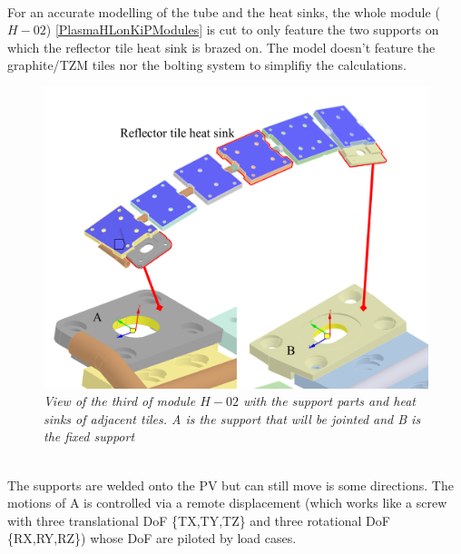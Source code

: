 \\
\normalsize{\indent For an accurate modelling of the tube and the heat sinks, the whole module ($H-02$) \ref{PlasmaHLonKiPModules} is cut to only feature the two supports on which the reflector tile heat sink is brazed on. The model doesn't feature the graphite/\acrshort{TZM} tiles nor the bolting system to simplifiy the calculations.}
\begin{figure}[!ht]
    \label{fig_5_15} 
    \centering
    \includegraphics[width=1\textwidth]{figures/one3rdOfModule.png}
    \caption{\it View of the third of module $H-02$ with the support parts and heat sinks of adjacent tiles. A is the support that will be jointed and B is the fixed support}
\end{figure}
\\
\normalsize{\indent The supports are welded onto the \acrshort{PV} but can still move is some directions. The motions of A is controlled via a remote displacement (which works like a screw with three translational \acrshort{DoF} \{TX,TY,TZ\} and three rotational \acrshort{DoF} \{RX,RY,RZ\}) whose \acrshort{DoF} are piloted by load cases.}
\\

